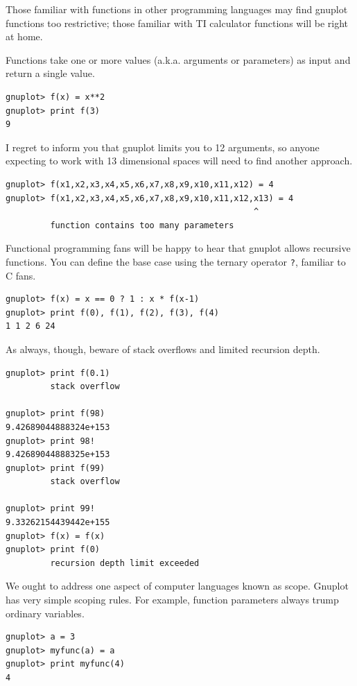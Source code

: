 \documentclass[11pt,letterpaper]{report}
\begin{document}
Those familiar with functions in other programming languages may find gnuplot functions too restrictive; those familiar with TI calculator functions will be right at home.

Functions take one or more values (a.k.a. arguments or parameters) as input and return a single value.

\begin{verbatim}
gnuplot> f(x) = x**2
gnuplot> print f(3)
9
\end{verbatim}

I regret to inform you that gnuplot limits you to 12 arguments, so anyone expecting to work with 13 dimensional spaces will need to find another approach.

\begin{verbatim}
gnuplot> f(x1,x2,x3,x4,x5,x6,x7,x8,x9,x10,x11,x12) = 4
gnuplot> f(x1,x2,x3,x4,x5,x6,x7,x8,x9,x10,x11,x12,x13) = 4
                                                  ^
         function contains too many parameters

\end{verbatim}

Functional programming fans will be happy to hear that gnuplot allows recursive functions. You can define the base case using the ternary operator \verb+?+, familiar to C fans.

\begin{lstlisting}
gnuplot> f(x) = x == 0 ? 1 : x * f(x-1)
gnuplot> print f(0), f(1), f(2), f(3), f(4)
1 1 2 6 24
\end{lstlisting}

As always, though, beware of stack overflows and limited recursion depth.

\begin{lstlisting}
gnuplot> print f(0.1)
         stack overflow

gnuplot> print f(98)
9.42689044888324e+153
gnuplot> print 98!
9.42689044888325e+153
gnuplot> print f(99)
         stack overflow
         
gnuplot> print 99!
9.33262154439442e+155
gnuplot> f(x) = f(x)
gnuplot> print f(0)
         recursion depth limit exceeded
\end{lstlisting}



We ought to address one aspect of computer languages known as scope. Gnuplot has very simple scoping rules. For example, function parameters always trump ordinary variables.

\begin{verbatim}
gnuplot> a = 3
gnuplot> myfunc(a) = a
gnuplot> print myfunc(4)
4
\end{verbatim}
\end{document}
